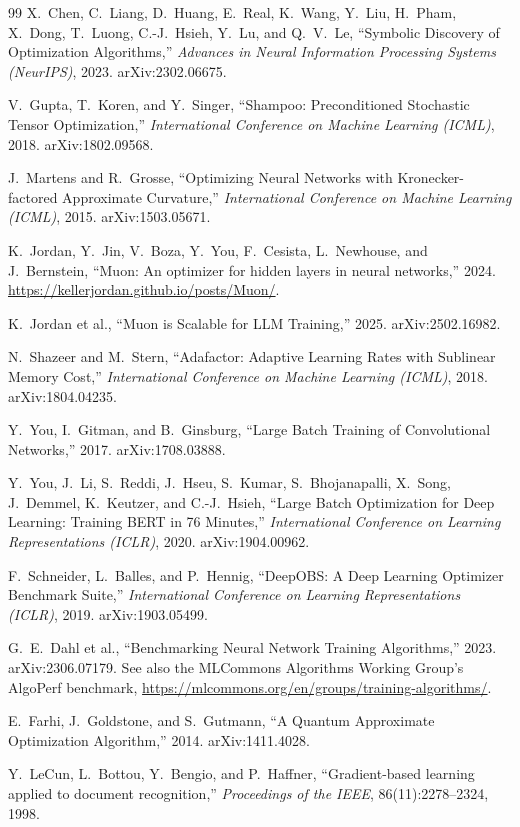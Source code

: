 \documentclass[10pt,twocolumn]{article}
\begin{document}
\begin{thebibliography}{99}
X.~Chen, C.~Liang, D.~Huang, E.~Real, K.~Wang, Y.~Liu, H.~Pham, X.~Dong,
T.~Luong, C.-J.~Hsieh, Y.~Lu, and Q.~V.~Le,
``Symbolic Discovery of Optimization Algorithms,''
\emph{Advances in Neural Information Processing Systems (NeurIPS)}, 2023.
arXiv:2302.06675.

V.~Gupta, T.~Koren, and Y.~Singer,
``Shampoo: Preconditioned Stochastic Tensor Optimization,''
\emph{International Conference on Machine Learning (ICML)}, 2018.
arXiv:1802.09568.

J.~Martens and R.~Grosse,
``Optimizing Neural Networks with Kronecker-factored Approximate Curvature,''
\emph{International Conference on Machine Learning (ICML)}, 2015.
arXiv:1503.05671.

K.~Jordan, Y.~Jin, V.~Boza, Y.~You, F.~Cesista, L.~Newhouse, and J.~Bernstein,
``Muon: An optimizer for hidden layers in neural networks,'' 2024.
\url{https://kellerjordan.github.io/posts/Muon/}.

K.~Jordan et al.,
``Muon is Scalable for LLM Training,'' 2025.
arXiv:2502.16982.

N.~Shazeer and M.~Stern,
``Adafactor: Adaptive Learning Rates with Sublinear Memory Cost,''
\emph{International Conference on Machine Learning (ICML)}, 2018.
arXiv:1804.04235.

Y.~You, I.~Gitman, and B.~Ginsburg,
``Large Batch Training of Convolutional Networks,'' 2017.
arXiv:1708.03888.

Y.~You, J.~Li, S.~Reddi, J.~Hseu, S.~Kumar, S.~Bhojanapalli, X.~Song,
J.~Demmel, K.~Keutzer, and C.-J.~Hsieh,
``Large Batch Optimization for Deep Learning: Training BERT in 76 Minutes,''
\emph{International Conference on Learning Representations (ICLR)}, 2020.
arXiv:1904.00962.

F.~Schneider, L.~Balles, and P.~Hennig,
``DeepOBS: A Deep Learning Optimizer Benchmark Suite,''
\emph{International Conference on Learning Representations (ICLR)}, 2019.
arXiv:1903.05499.

G.~E.~Dahl et al.,
``Benchmarking Neural Network Training Algorithms,'' 2023.
arXiv:2306.07179. See also the MLCommons Algorithms Working Group's AlgoPerf
benchmark, \url{https://mlcommons.org/en/groups/training-algorithms/}.

E.~Farhi, J.~Goldstone, and S.~Gutmann,
``A Quantum Approximate Optimization Algorithm,'' 2014.
arXiv:1411.4028.

Y.~LeCun, L.~Bottou, Y.~Bengio, and P.~Haffner,
``Gradient-based learning applied to document recognition,''
\emph{Proceedings of the IEEE}, 86(11):2278--2324, 1998.

\end{thebibliography}
\end{document}
